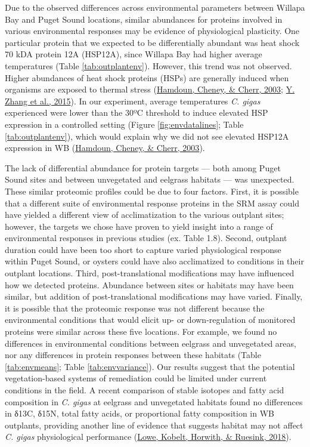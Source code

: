 \documentclass [11pt, proquest] {uwthesis}[2015/03/03]
\begin{document}
Due to the observed differences across environmental parameters between Willapa Bay and Puget Sound locations, similar abundances for proteins involved in various environmental responses may be evidence of physiological plasticity. One particular protein that we expected to be differentially abundant was heat shock 70 kDA protein 12A (HSP12A), since Willapa Bay had higher average temperatures (Table \ref{tab:outplantenv}). However, this trend was not observed. Higher abundances of heat shock proteins (HSPs) are generally induced when organisms are exposed to thermal stress (\protect\hyperlink{ref-Hamdoun2003}{Hamdoun, Cheney, \& Cherr, 2003}; \protect\hyperlink{ref-Zhang2015}{Y. Zhang et al., 2015}). In our experiment, average temperatures \emph{C. gigas} experienced were lower than the 30ºC threshold to induce elevated HSP expression in a controlled setting (Figure \ref{fig:envdatalines}; Table \ref{tab:outplantenv}), which would explain why we did not see elevated HSP12A expression in WB (\protect\hyperlink{ref-Hamdoun2003}{Hamdoun, Cheney, \& Cherr, 2003}).

The lack of differential abundance for protein targets --- both among Puget Sound sites and between unvegetated and eelgrass habitats --- was unexpected. These similar proteomic profiles could be due to four factors. First, it is possible that a different suite of environmental response proteins in the SRM assay could have yielded a different view of acclimatization to the various outplant sites; however, the targets we chose have proven to yield insight into a range of environmental responses in previous studies (ex. Table 1.8). Second, outplant duration could have been too short to capture varied physiological response within Puget Sound, or oysters could have also acclimatized to conditions in their outplant locations. Third, post-translational modifications may have influenced how we detected proteins. Abundance between sites or habitats may have been similar, but addition of post-translational modifications may have varied. Finally, it is possible that the proteomic response was not different because the environmental conditions that would elicit up- or down-regulation of monitored proteins were similar across these five locations. For example, we found no differences in environmental conditions between eelgrass and unvegetated areas, nor any differences in protein responses between these habitats (Table \ref{tab:envmeans}; Table \ref{tab:envvariance}). Our results suggest that the potential vegetation-based systems of remediation could be limited under current conditions in the field. A recent comparison of stable isotopes and fatty acid composition in \emph{C. gigas} at eelgrass and unvegetated habitats found no differences in δ13C, δ15N, total fatty acids, or proportional fatty composition in WB outplants, providing another line of evidence that suggests habitat may not affect \emph{C. gigas} physiological performance (\protect\hyperlink{ref-Lowe2018}{Lowe, Kobelt, Horwith, \& Ruesink, 2018}).
\end{document}
